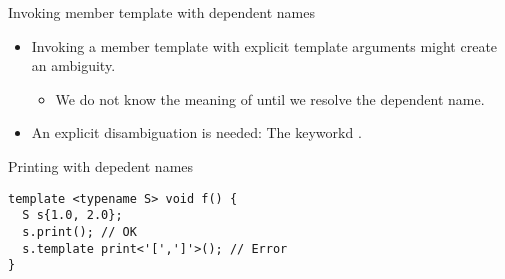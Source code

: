 \begin{frame}[t,fragile]{Invoking member template with dependent names}
\begin{itemize}
  \item Invoking a member template with explicit template arguments might create an ambiguity.
    \begin{itemize}
      \item We do not know the meaning of \cppkey{<} until we resolve the dependent name.
    \end{itemize}
  \item An explicit disambiguation is needed: The keyworkd .
\end{itemize}
\begin{block}{Printing with depedent names}
\begin{lstlisting}
template <typename S> void f() {
  S s{1.0, 2.0};
  s.print(); // OK
  s.template print<'[',']'>(); // Error
}
\end{lstlisting}
\end{block}
\end{frame}
